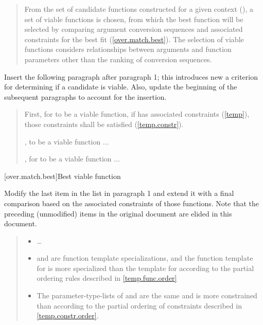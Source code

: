 \begin{quote}
\pnum
From the set of candidate functions constructed for a given context 
(), a set of viable functions is chosen, from which 
the best function will be selected by comparing argument conversion 
sequences and associated constraints for the best fit 
(\ref{over.match.best}).
%
The selection of viable functions considers  relationships between arguments and function 
parameters other than the ranking of conversion sequences.
\end{quote}


Insert the following paragraph after paragraph 1; this introduces
new a criterion for determining if a candidate is viable. Also, update
the beginning of the subsequent paragraphs to account for the
insertion.

\begin{quote}
\setcounter{Paras}{1}
\pnum
First, for  to be a viable function, if  has 
associated constraints (\ref{temp}), those 
constraints shall be satisfied (\ref{temp.constr}).

\pnum
{}, to be a viable function ...

\pnum
{}, for  to be a viable function ...
\end{quote}


[over.match.best]{Best viable function}

Modify the last item in the list in paragraph 1 and extend it with a final
comparison based on the associated constraints of those functions. Note that 
the preceding (unmodified) items in the original document are elided in this
document.

\begin{quote}
\begin{itemize}
\item \ldots

\item {} and  are function template specializations, and 
the function template for  is more specialized than the template 
for  according to the partial ordering rules described in
\ref{temp.func.order}

\item
The parameter-type-lists of  and  are
the same and  is more constrained than  
according to the partial ordering of constraints described in
\ref{temp.constr.order}.
\end{itemize}
\end{quote}


